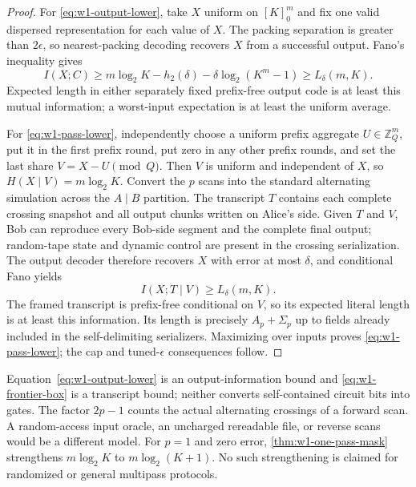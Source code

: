 \begin{proof}
For \eqref{eq:w1-output-lower}, take $X$ uniform on $[K]_0^m$ and fix one
valid dispersed representation for each value of $X$.
The packing separation is greater than $2\epsilon$, so nearest-packing
decoding recovers $X$ from a successful output.  Fano's inequality gives
\begin{equation*}
 I(X;C)\geq m\log_2K-h_2(\delta)
 -\delta\log_2(K^m-1)\geq L_\delta(m,K).
\end{equation*}
Expected length in either separately fixed prefix-free output code is at
least this mutual information; a worst-input expectation is at least the
uniform average.

For \eqref{eq:w1-pass-lower}, independently choose a uniform prefix
aggregate $U\in\mathbb Z_Q^m$, put it in the first prefix round, put zero
in any other prefix rounds, and set the last share $V=X-U\pmod Q$.
Then $V$ is uniform and independent of $X$, so
$H(X\mid V)=m\log_2K$.  Convert the $p$ scans into the standard alternating
simulation across the $A\mid B$ partition.  The transcript $T$ contains
each complete crossing snapshot and all output chunks written on Alice's
side.  Given $T$ and $V$, Bob can reproduce every Bob-side segment and the
complete final output; random-tape state and dynamic control are present in
the crossing serialization.  The output decoder therefore recovers $X$
with error at most $\delta$, and conditional Fano yields
\begin{equation*}
 I(X;T\mid V)\geq L_\delta(m,K).
\end{equation*}
The framed transcript is prefix-free conditional on $V$, so its expected
literal length is at least this information.  Its length is precisely
$A_p+\Sigma_p$ up to fields already included in the self-delimiting
serializers.  Maximizing over inputs proves \eqref{eq:w1-pass-lower}; the
cap and tuned-$\epsilon$ consequences follow.
\end{proof}

\begin{remark}
\label{rem:w1-optimality-scope}
Equation~\eqref{eq:w1-output-lower} is an output-information bound and
\eqref{eq:w1-frontier-box} is a transcript bound; neither converts
self-contained circuit bits into gates.  The factor $2p-1$ counts the
actual alternating crossings of a forward scan.  A random-access input
oracle, an uncharged rereadable file, or reverse scans would be a different
model.  For $p=1$ and zero error, \cref{thm:w1-one-pass-mask} strengthens
$m\log_2K$ to $m\log_2(K+1)$.  No such strengthening is claimed for
randomized or general multipass protocols.
\end{remark}
